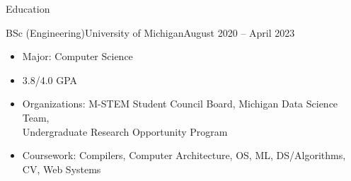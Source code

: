 \documentclass[]{mcdowellcv}
\begin{document}
	\makeheader
	
	\begin{cvsection}{Education}
		\begin{cvsubsection}{BSc (Engineering)}{University of Michigan}{August 2020 -- April 2023}
			\small{
				\begin{itemize}
					\item Major: Computer Science
					\item 3.8/4.0 GPA
					\item Organizations: M-STEM Student Council Board, Michigan Data Science Team,\\Undergraduate Research Opportunity Program
					\item Coursework: Compilers, Computer Architecture, OS, ML, DS/Algorithms, CV, Web Systems
				\end{itemize}
			}
		\end{cvsubsection}
	\end{cvsection}
\end{document}
